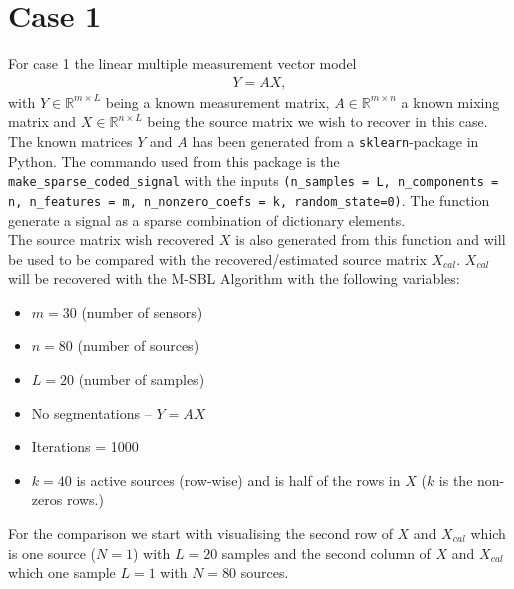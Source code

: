 \section{Case 1}
For case 1 the linear multiple measurement vector model
\begin{align*}
Y = AX,
\end{align*}
with $Y \in \mathbb{R}^{m \times L}$ being a known measurement matrix, $A \in \mathbb{R}^{m \times n}$ a known mixing matrix and $X \in \mathbb{R}^{n \times L}$ being the source matrix we wish to recover in this case.
\\
The known matrices $Y$ and $A$ has been generated from a \texttt{sklearn}-package in Python. The commando used from this package is the \texttt{make\_sparse\_coded\_signal} with the inputs \texttt{(n\_samples = L, n\_components = n, n\_features = m, n\_nonzero\_coefs = k, random\_state=0)}. The function generate a signal as a sparse combination of dictionary elements.
\\
The source matrix wish recovered $X$ is also generated from this function and will be used to be compared with the recovered/estimated source matrix $X_{cal}$. $X_{cal}$ will be recovered with the M-SBL Algorithm with the following variables: 
\begin{itemize}
\item $m = 30$ (number of sensors)
\item $n = 80$ (number of sources)
\item $L = 20$ (number of samples)
\item No segmentations -- $Y = AX$
\item Iterations = 1000
\item $k = 40$ is active sources (row-wise) and is half of the rows in $X$ ($k$ is the non-zeros rows.)   
\end{itemize}
For the comparison we start with visualising the second row of $X$ and $X_{cal}$ which is one source ($N=1$) with $L = 20$ samples and the second column of $X$ and $X_{cal}$ which one sample $L=1$ with $N = 80$ sources.
